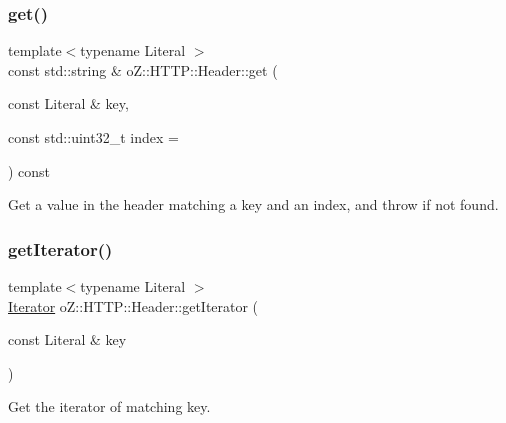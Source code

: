 \subsubsection{\texorpdfstring{get()}{get()}\hspace{0.1cm}{\footnotesize\ttfamily [2/2]}}
{\footnotesize\ttfamily template$<$typename Literal $>$ \\
const std\+::string \& o\+Z\+::\+H\+T\+T\+P\+::\+Header\+::get (\begin{DoxyParamCaption}\item[{const Literal \&}]{key,  }\item[{const std\+::uint32\+\_\+t}]{index = {} }\end{DoxyParamCaption}) const}



Get a value in the header matching a key and an index, and throw if not found. 

\mbox{\label{classo_z_1_1_h_t_t_p_1_1_header_ae20764876b35b2185394eafcb007454b}} 
\subsubsection{\texorpdfstring{getIterator()}{getIterator()}\hspace{0.1cm}{\footnotesize\ttfamily [1/2]}}
{\footnotesize\ttfamily template$<$typename Literal $>$ \\
\mbox{\hyperlink{classo_z_1_1_h_t_t_p_1_1_header_a572d529cae124a02fb68df9c3e51c576}{Iterator}} o\+Z\+::\+H\+T\+T\+P\+::\+Header\+::get\+Iterator (\begin{DoxyParamCaption}\item[{const Literal \&}]{key }\end{DoxyParamCaption})\hspace{0.3cm}{\ttfamily [inline]}}



Get the iterator of matching key. 

\mbox{\label{classo_z_1_1_h_t_t_p_1_1_header_a43a6b9a03c9a46c4eeee0df3c3990d63}} 
